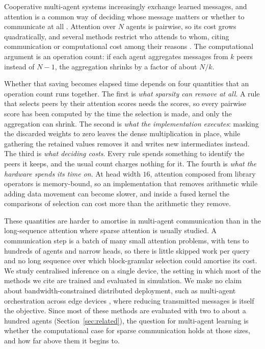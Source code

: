 Cooperative multi-agent systems increasingly exchange learned messages, and
attention is a common way of deciding whose message matters
\citep{das2019tarmac,jiang2018dgn} or whether to communicate at all
\citep{jiang2018atoc}.
Attention over $N$ agents is pairwise, so its cost grows quadratically, and
several methods restrict who attends to whom, citing communication or
computational cost among their reasons
\citep{jiang2018dgn,sun2020sparsecomm}. The computational
argument is an operation count: if each agent aggregates messages from $k$ peers
instead of $N-1$, the aggregation shrinks by a factor of about $N/k$.

Whether that saving becomes elapsed time depends on four quantities that an
operation count runs together. The first is \emph{what sparsity can remove at
all}. A rule that selects peers by their attention scores needs the scores, so
every pairwise score has been computed by the time the selection is made, and
only the aggregation can shrink. The second is \emph{what the implementation
executes}: masking the discarded weights to zero leaves the dense
multiplication in place, while gathering the retained values removes it and
writes new intermediates instead. The third is \emph{what deciding costs}. Every
rule spends something to identify the peers it keeps, and the usual count
charges nothing for it. The fourth is \emph{what the hardware spends its time
on}. At head width $16$, attention composed from library operators is
memory-bound, so an implementation that removes arithmetic while adding data
movement can become slower, and inside a fused kernel the comparisons of
selection can cost more than the arithmetic they remove.

These quantities are harder to amortise in multi-agent communication than in the
long-sequence attention where sparse attention is usually studied. A
communication step is a batch of many small attention problems, with tens to
hundreds of agents and narrow heads, so there is little skipped work per query
and no long sequence over which block-granular selection could amortise its
cost. We study centralised inference on a single device, the setting in which
most of the methods we cite are trained and evaluated in simulation. We make no
claim about bandwidth-constrained distributed deployment, such as multi-agent
orchestration across edge devices \citep{marliotp2026}, where reducing
transmitted messages is itself the objective. Since most of these methods are
evaluated with two to about a hundred agents (Section~\ref{sec:related}), the
question for multi-agent learning is whether the computational case for sparse
communication holds at those sizes, and how far above them it begins to.

